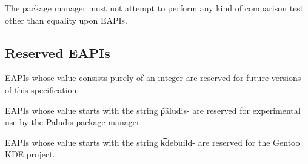 The package manager must not attempt to perform any kind of comparison test other than equality upon
EAPIs.

\subsection{Reserved EAPIs}

\begin{compactitem}
\item EAPIs whose value consists purely of an integer are reserved for future versions of this
    specification.
\item EAPIs whose value starts with the string \t{paludis-} are reserved for experimental
    use by the Paludis package manager.
\item EAPIs whose value starts with the string \t{kdebuild-} are reserved for the Gentoo KDE
    project.
\end{compactitem}


